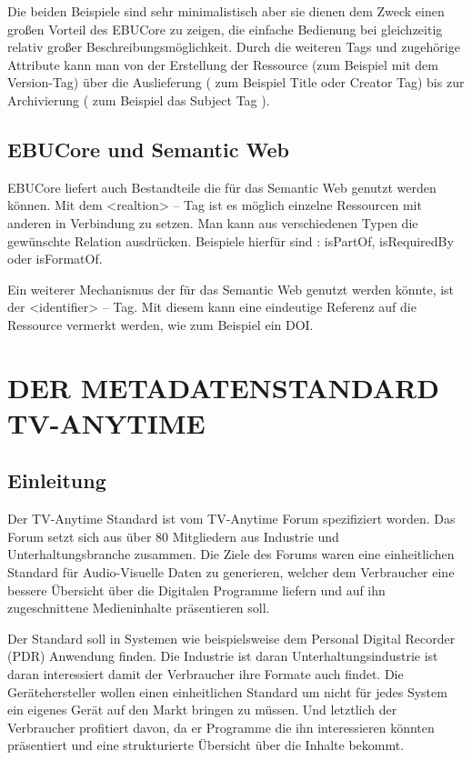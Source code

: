Die beiden Beispiele sind sehr minimalistisch aber sie dienen dem Zweck einen großen Vorteil des EBUCore zu zeigen, die einfache Bedienung bei gleichzeitig relativ großer Beschreibungsmöglichkeit. Durch die weiteren Tags und zugehörige Attribute kann man von der Erstellung der Ressource (zum Beispiel mit dem Version-Tag) über die Auslieferung ( zum Beispiel Title oder Creator Tag)  bis zur Archivierung ( zum Beispiel das Subject Tag ).
\subsection{EBUCore und Semantic Web}

EBUCore liefert auch Bestandteile die für das Semantic Web genutzt werden können. Mit dem <realtion> -- Tag ist es möglich einzelne Ressourcen mit anderen in Verbindung zu setzen. Man kann aus verschiedenen Typen die gewünschte Relation ausdrücken. Beispiele hierfür sind : isPartOf, isRequiredBy oder isFormatOf.

	Ein weiterer Mechanismus der für das Semantic Web genutzt werden könnte, ist der <identifier> -- Tag. Mit diesem kann eine eindeutige Referenz auf die Ressource vermerkt werden, wie zum Beispiel ein DOI.
	\section{DER METADATENSTANDARD TV-ANYTIME}
	\subsection{Einleitung}
	Der TV-Anytime Standard ist vom TV-Anytime Forum spezifiziert worden. Das Forum setzt sich aus über 80 Mitgliedern aus Industrie und Unterhaltungsbranche zusammen. Die Ziele des Forums waren eine einheitlichen Standard für Audio-Visuelle Daten zu generieren, welcher dem Verbraucher eine bessere Übersicht über die Digitalen Programme liefern und auf ihn zugeschnittene Medieninhalte präsentieren soll.
	
	Der Standard soll in Systemen wie beispielsweise dem Personal Digital Recorder (PDR) Anwendung finden. Die Industrie ist daran Unterhaltungsindustrie ist daran interessiert damit der Verbraucher ihre Formate auch findet. Die Gerätehersteller wollen einen einheitlichen Standard um nicht für jedes System ein eigenes Gerät auf den Markt bringen zu müssen. Und letztlich der Verbraucher profitiert davon, da er Programme die ihn interessieren könnten präsentiert und eine strukturierte Übersicht über die Inhalte bekommt.

